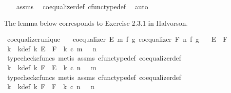 \begin{isabellebody}
%
\isadelimproof
\ \ %
\endisadelimproof
%
\isatagproof
{}\isamarkupfalse%
\ assms\ \isamarkupfalse%
\ coequalizer{\isacharunderscore}{\kern0pt}def\ cfunc{\isacharunderscore}{\kern0pt}type{\isacharunderscore}{\kern0pt}def\ \isamarkupfalse%
\ auto%
\endisatagproof
{\isafoldproof}%
%
\isadelimproof
%
\endisadelimproof
%
\begin{isamarkuptext}%
The lemma below corresponds to Exercise 2.3.1 in Halvorson.%
\end{isamarkuptext}\isamarkuptrue%
\isamarkupfalse%
\ coequalizer{\isacharunderscore}{\kern0pt}unique{\isacharcolon}{\kern0pt}\isanewline
\ \ \ {\isachardoublequoteopen}coequalizer\ E\ m\ f\ g{\isachardoublequoteclose}\ {\isachardoublequoteopen}coequalizer\ F\ n\ f\ g{\isachardoublequoteclose}\isanewline
\ \ \ {\isachardoublequoteopen}E\ {\isasymcong}\ F{\isachardoublequoteclose}\isanewline
%
\isadelimproof
%
\endisadelimproof
%
\isatagproof
{}\isamarkupfalse%
\ {\isacharminus}{\kern0pt}\ \isanewline
\ \ \isamarkupfalse%
\ k\ \ k{\isacharunderscore}{\kern0pt}def{\isacharcolon}{\kern0pt}\ {\isachardoublequoteopen}k{\isacharcolon}{\kern0pt}\ E\ {\isasymrightarrow}\ F\ {\isasymand}\ k\ {\isasymcirc}\isactrlsub c\ m\ {\isacharequal}{\kern0pt}\ \ n{\isachardoublequoteclose}\isanewline
\ \ \ \ \ \isamarkupfalse%
\ {\isacharparenleft}{\kern0pt}typecheck{\isacharunderscore}{\kern0pt}cfuncs{\isacharcomma}{\kern0pt}\ metis\ assms\ cfunc{\isacharunderscore}{\kern0pt}type{\isacharunderscore}{\kern0pt}def\ coequalizer{\isacharunderscore}{\kern0pt}def{\isacharparenright}{\kern0pt}\isanewline
\ \ \isamarkupfalse%
\ k{\isacharprime}{\kern0pt}\ \ k{\isacharprime}{\kern0pt}{\isacharunderscore}{\kern0pt}def{\isacharcolon}{\kern0pt}\ {\isachardoublequoteopen}k{\isacharprime}{\kern0pt}{\isacharcolon}{\kern0pt}\ F\ {\isasymrightarrow}\ E\ {\isasymand}\ k{\isacharprime}{\kern0pt}\ {\isasymcirc}\isactrlsub c\ n\ {\isacharequal}{\kern0pt}\ \ m{\isachardoublequoteclose}\isanewline
\ \ \ \ \ \isamarkupfalse%
\ {\isacharparenleft}{\kern0pt}typecheck{\isacharunderscore}{\kern0pt}cfuncs{\isacharcomma}{\kern0pt}\ metis\ assms\ cfunc{\isacharunderscore}{\kern0pt}type{\isacharunderscore}{\kern0pt}def\ coequalizer{\isacharunderscore}{\kern0pt}def{\isacharparenright}{\kern0pt}\isanewline
\ \ \isamarkupfalse%
\ k{\isacharprime}{\kern0pt}{\isacharprime}{\kern0pt}\ \ k{\isacharprime}{\kern0pt}{\isacharprime}{\kern0pt}{\isacharunderscore}{\kern0pt}def{\isacharcolon}{\kern0pt}\ {\isachardoublequoteopen}k{\isacharprime}{\kern0pt}{\isacharprime}{\kern0pt}{\isacharcolon}{\kern0pt}\ F\ {\isasymrightarrow}\ F\ {\isasymand}\ k{\isacharprime}{\kern0pt}{\isacharprime}{\kern0pt}\ {\isasymcirc}\isactrlsub c\ n\ {\isacharequal}{\kern0pt}\ \ n{\isachardoublequoteclose}\isanewline

\end{isabellebody}
